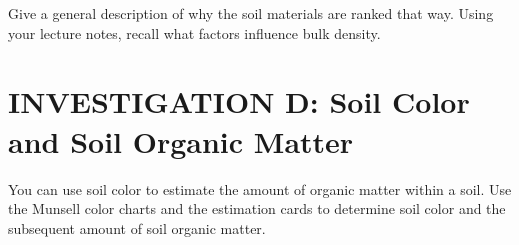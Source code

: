 \documentclass[
  letterpaper,
  twocolumn,
  portrait]{scrbook}
\begin{document}
Give a general description of why the soil materials are ranked that
way. Using your lecture notes, recall what factors influence bulk
density.

\hypertarget{investigation-d-soil-color-and-soil-organic-matter}{%
\section{INVESTIGATION D: Soil Color and Soil Organic
Matter}\label{investigation-d-soil-color-and-soil-organic-matter}}

You can use soil color to estimate the amount of organic matter within a
soil. Use the Munsell color charts and the estimation cards to determine
soil color and the subsequent amount of soil organic matter.

 
  \providecommand{\huxb}[2]{\arrayrulecolor[RGB]{#1}\global\arrayrulewidth=#2pt}
  \providecommand{\huxvb}[2]{\color[RGB]{#1}\vrule width #2pt}
  \providecommand{\huxtpad}[1]{\rule{0pt}{#1}}
  \providecommand{\huxbpad}[1]{\rule[-#1]{0pt}{#1}}
\end{document}
